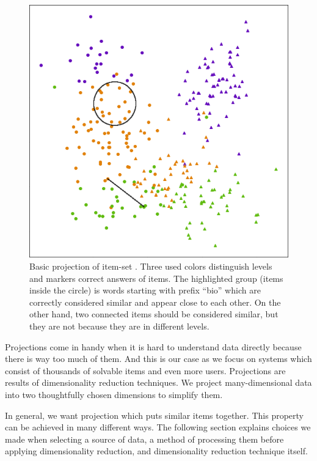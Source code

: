 \documentclass[
  printed, %
  table,   %
  nolof,     %
  nolot,     %
  color,
  final,
  nocover
]{fithesis3}
\begin{document}
\begin{figure}
    \includegraphics[width=\textwidth]{img/common_projection}
  \caption{Basic projection of item-set \cviceniB{}. Three used colors distinguish levels and markers correct answers of items. The highlighted group (items inside the circle) is words starting with prefix ``bio'' which are correctly considered similar and appear close to each other. On the other hand, two connected items should be considered similar, but they are not because they are in different levels.}
  \label{fig:common_projection}
\end{figure}


Projections come in handy when it is hard to understand data directly because there is way too much of them. And this is our case as we focus on systems which consist of thousands of solvable items and even more users. Projections are results of dimensionality reduction techniques. We project many-dimensional data into two thoughtfully chosen dimensions to simplify them.


In general, we want projection which puts similar items together. This property can be achieved in many different ways. The following section explains choices we made when selecting a source of data, a method of processing them before applying dimensionality reduction, and dimensionality reduction technique itself.
\end{document}
